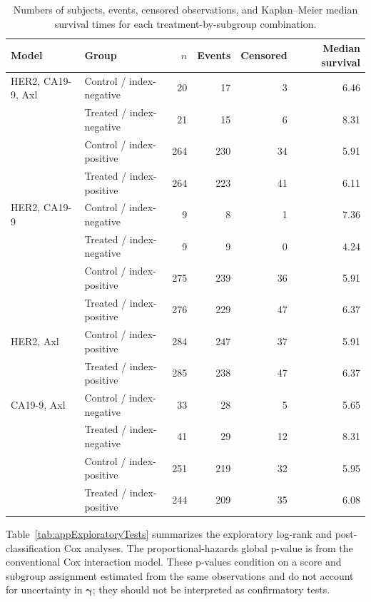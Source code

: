 \begin{table}[p]
\caption[Complete treatment-by-subgroup summaries]{Numbers of subjects,
events, censored observations, and Kaplan--Meier median survival times for
each treatment-by-subgroup combination.}
\label{tab:appGroupSummaries}
\centering
\scriptsize
\begin{tabular}{llrrrr}
\toprule
Model & Group & $n$ & Events & Censored & Median survival \\
\midrule
HER2, CA19-9, Axl & Control / index-negative & 20 & 17 & 3 & 6.46 \\
& Treated / index-negative & 21 & 15 & 6 & 8.31 \\
& Control / index-positive & 264 & 230 & 34 & 5.91 \\
& Treated / index-positive & 264 & 223 & 41 & 6.11 \\
\addlinespace
HER2, CA19-9 & Control / index-negative & 9 & 8 & 1 & 7.36 \\
& Treated / index-negative & 9 & 9 & 0 & 4.24 \\
& Control / index-positive & 275 & 239 & 36 & 5.91 \\
& Treated / index-positive & 276 & 229 & 47 & 6.37 \\
\addlinespace
HER2, Axl & Control / index-positive & 284 & 247 & 37 & 5.91 \\
& Treated / index-positive & 285 & 238 & 47 & 6.37 \\
\addlinespace
CA19-9, Axl & Control / index-negative & 33 & 28 & 5 & 5.65 \\
& Treated / index-negative & 41 & 29 & 12 & 8.31 \\
& Control / index-positive & 251 & 219 & 32 & 5.95 \\
& Treated / index-positive & 244 & 209 & 35 & 6.08 \\
\bottomrule
\end{tabular}
\end{table}

\clearpage

Table~\ref{tab:appExploratoryTests} summarizes the exploratory log-rank and
post-classification Cox analyses. The proportional-hazards global p-value is
from the conventional Cox interaction model. These p-values condition on a
score and subgroup assignment estimated from the same observations and do
not account for uncertainty in $\boldsymbol\gamma$; they should not be
interpreted as confirmatory tests.

